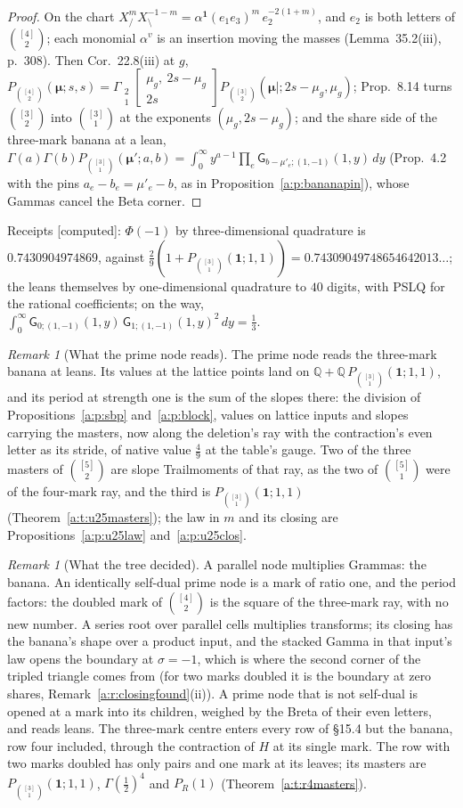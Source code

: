 \documentclass[11pt]{article}
\newcommand{\one}{\mathbf 1}
\newcommand{\bmu}{\boldsymbol\mu}
\newcommand{\sG}{\mathsf G}
\newcommand{\Gst}[4]{\Gamma_{\substack{#1\\#2}}\!\begin{bmatrix}#3\\#4\end{bmatrix}}
\newcommand{\Pth}{P_{\binom{[3]}1}(\one;1,1)}
\theoremstyle{plain}
\theoremstyle{definition}
\theoremstyle{remark}
\newtheorem{remark}[proposition]{Remark}
\newcommand{\computed}{\textup{[computed]}}
\begin{document}
\begin{proof}
On the chart $X_{/}^mX_{\setminus}^{-1-m}=\alpha^{\one}(e_1e_3)^m\,e_2^{-2(1+m)}$, and $e_2$ is both letters of $\binom{[4]}2$; each monomial $\alpha^v$ is an insertion moving the masses (Lemma~35.2(iii), p.~308). Then Cor.~22.8(iii) at $g$, $P_{\binom{[4]}2}(\bmu;s,s)=\Gst21{\mu_g,\ 2s-\mu_g}{2s}P_{\binom{[3]}2}(\bmu|;2s-\mu_g,\mu_g)$; Prop.~8.14 turns $\binom{[3]}2$ into $\binom{[3]}1$ at the exponents $(\mu_g,2s-\mu_g)$; and the share side of the three-mark banana at a lean, $\Gamma(a)\Gamma(b)P_{\binom{[3]}1}(\bmu';a,b)=\int_0^\infty y^{a-1}\prod_e\sG_{b-\mu'_e;(1,-1)}(1,y)\,dy$ (Prop.~4.2 with the pins $a_e-b_e=\mu'_e-b$, as in Proposition~\ref{a:p:bananapin}), whose Gammas cancel the Beta corner.
\end{proof}

\noindent Receipts \computed: $\Phi(-1)$ by three-dimensional quadrature is $0.7430904974869$, against $\frac29(1+P_{\binom{[3]}1}(\one;1,1))=0.74309049748654642013\ldots$; the leans themselves by one-dimensional quadrature to $40$ digits, with PSLQ for the rational coefficients; on the way, $\int_0^\infty\sG_{0;(1,-1)}(1,y)\,\sG_{1;(1,-1)}(1,y)^2\,dy=\frac13$.

\begin{remark}[What the prime node reads]\label{a:auto:16.8}
The prime node reads the three-mark banana at leans. Its values at the lattice points land on $\mathbb Q+\mathbb Q\,P_{\binom{[3]}1}(\one;1,1)$, and its period at strength one is the sum of the slopes there: the division of Propositions~\ref{a:p:sbp} and~\ref{a:p:block}, values on lattice inputs and slopes carrying the masters, now along the deletion's ray with the contraction's even letter as its stride, of native value $\frac49$ at the table's gauge. Two of the three masters of $\binom{[5]}2$ are slope Trailmoments of that ray, as the two of $\binom{[5]}1$ were of the four-mark ray, and the third is $\Pth$ (Theorem~\ref{a:t:u25masters}); the law in $m$ and its closing are Propositions~\ref{a:p:u25law} and~\ref{a:p:u25clos}.
\end{remark}

\begin{remark}[What the tree decided]\label{a:auto:16.9}
A parallel node multiplies Grammas: the banana. An identically self-dual prime node is a mark of ratio one, and the period factors: the doubled mark of $\binom{[4]}2$ is the square of the three-mark ray, with no new number. A series root over parallel cells multiplies transforms; its closing has the banana's shape over a product input, and the stacked Gamma in that input's law opens the boundary at $\sigma=-1$, which is where the second corner of the tripled triangle comes from (for two marks doubled it is the boundary at zero shares, Remark~\ref{a:r:closingfound}(ii)). A prime node that is not self-dual is opened at a mark into its children, weighed by the Breta of their even letters, and reads leans. The three-mark centre enters every row of \S15.4 but the banana, row four included, through the contraction of $H$ at its single mark. The row with two marks doubled has only pairs and one mark at its leaves; its masters are $\Pth$, $\Gamma(\frac12)^4$ and $P_R(1)$ (Theorem~\ref{a:t:r4masters}).
\end{remark}
\end{document}
